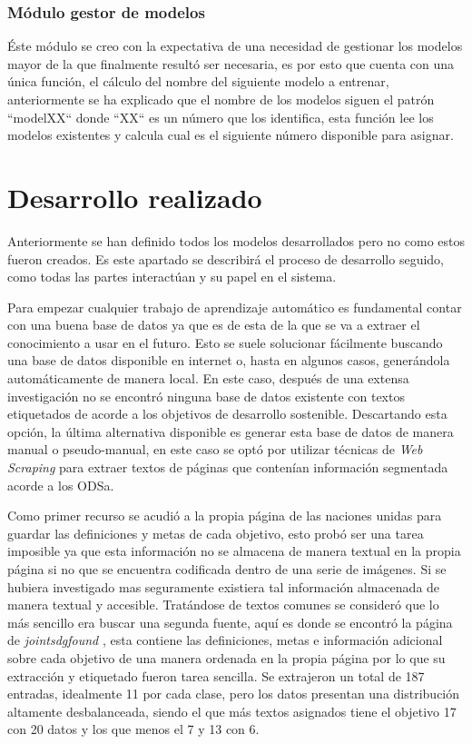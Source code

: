 \subsubsection{Módulo gestor de modelos} Éste módulo se creo con la expectativa de una necesidad
de gestionar los modelos mayor de la que finalmente resultó ser necesaria, es
por esto que cuenta con una única función, el cálculo del nombre del siguiente
modelo a entrenar, anteriormente se ha explicado que el nombre de los modelos
siguen el patrón ``modelXX`` donde ``XX`` es un número que los identifica, esta función
lee los modelos existentes y calcula cual es el siguiente número disponible para
asignar.


\section{Desarrollo realizado}Anteriormente se han definido todos los modelos
desarrollados pero no como estos fueron creados. Es este apartado se describirá el proceso de
desarrollo seguido, como todas las partes interactúan y su papel en el sistema.

Para empezar cualquier trabajo de aprendizaje automático es fundamental contar
con una buena base de datos ya que es de esta de la que se va a extraer el
conocimiento a usar en el futuro. Esto se suele solucionar fácilmente buscando
una base de datos disponible en internet o, hasta en algunos casos, generándola
automáticamente de manera local. En este caso, después de una extensa
investigación no se encontró ninguna base de datos existente con textos
etiquetados de acorde a los objetivos de desarrollo sostenible. Descartando esta
opción, la última alternativa disponible es generar esta base de datos de manera
manual o pseudo-manual, en este caso se optó por utilizar técnicas de \textit{Web
Scraping} para extraer textos de páginas que contenían información segmentada
acorde a los \gls{ODSa}. 

Como primer recurso se acudió a la propia página de
las naciones unidas para guardar las definiciones y metas de cada objetivo, esto
probó ser una tarea imposible ya que esta información no se almacena de manera
textual en la propia página si no que se encuentra codificada dentro de una
serie de imágenes. Si se hubiera investigado mas seguramente existiera tal
información almacenada de manera textual y accesible. Tratándose de textos
comunes se consideró que lo más sencillo era buscar una segunda fuente, aquí es
donde se encontró la página de \textit{jointsdgfound} \cite{JointSDGFund}, esta contiene las
definiciones, metas e información adicional sobre cada objetivo de una manera
ordenada en la propia página por lo que su extracción y etiquetado fueron tarea
sencilla. Se extrajeron un total de 187 entradas, idealmente 11 por cada clase,
pero los datos presentan una distribución altamente desbalanceada, siendo el que
más textos asignados tiene el objetivo 17 con 20 datos y los que menos el 7 y 13
con 6. 

